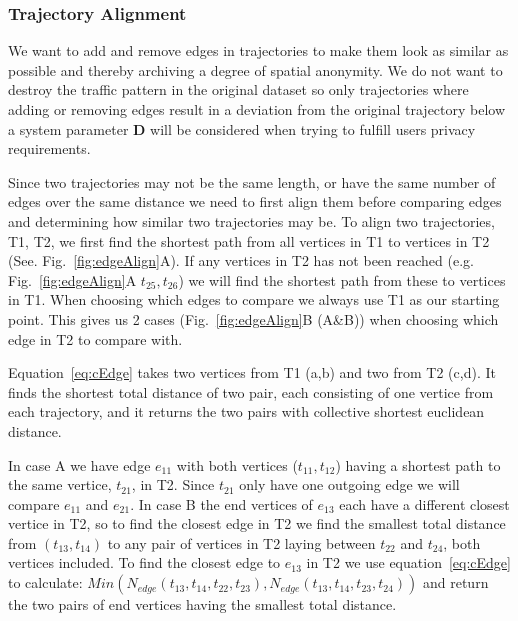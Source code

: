 

\subsubsection{Trajectory Alignment}\label{subsec:addremoveEdges}

We want to add and remove edges in trajectories to make them look as similar as possible and thereby archiving a degree of spatial anonymity. We do not want to destroy the traffic pattern in the original dataset so only trajectories where adding or removing edges result in a deviation from the original trajectory below a system parameter $\mathbf{D}$ will be considered when trying to fulfill users privacy requirements.

Since two trajectories may not be the same length, or have the same number of edges over the same distance we need to first align them before comparing edges and determining how similar two trajectories may be. 
To align two trajectories, T1, T2, we first find the shortest path from all vertices in T1 to vertices in T2 (See. Fig.~\ref{fig:edgeAlign}A). If any vertices in T2 has not been reached (e.g. Fig.~\ref{fig:edgeAlign}A $t_{25}, t_{26}$) we will find the shortest path from these to vertices in T1. 
When choosing which edges to compare we always use T1 as our starting point. This gives us 2 cases (Fig.~\ref{fig:edgeAlign}B (A\&B)) when choosing which edge in T2 to compare with. 

Equation~\ref{eq:cEdge} takes two vertices from T1 (a,b) and two from T2 (c,d). It finds the shortest total distance of two pair, each consisting of one vertice from each trajectory, and it returns the two pairs with collective shortest euclidean distance.

In case A we have edge \(e_{11}\) with both vertices ($t_{11},t_{12}$) having a shortest path to the same vertice, $t_{21}$, in T2. Since $t_{21}$ only have one outgoing edge we will compare \(e_{11}\) and \(e_{21}\).
In case B the end vertices of $e_{13}$ each have a different closest vertice in T2, so to find the closest edge in T2 we find the smallest total distance from $(t_{13},t_{14})$ to any pair of vertices in T2 laying between \(t_{22}\) and \(t_{24}\), both vertices included. To find the closest edge to $e_{13}$ in T2 we use equation~\ref{eq:cEdge} to calculate: \(Min\left(N_{edge}(t_{13},t_{14},t_{22},t_{23}),N_{edge}(t_{13},t_{14},t_{23},t_{24})\right)\) and return the two pairs of end vertices having the smallest total distance.

